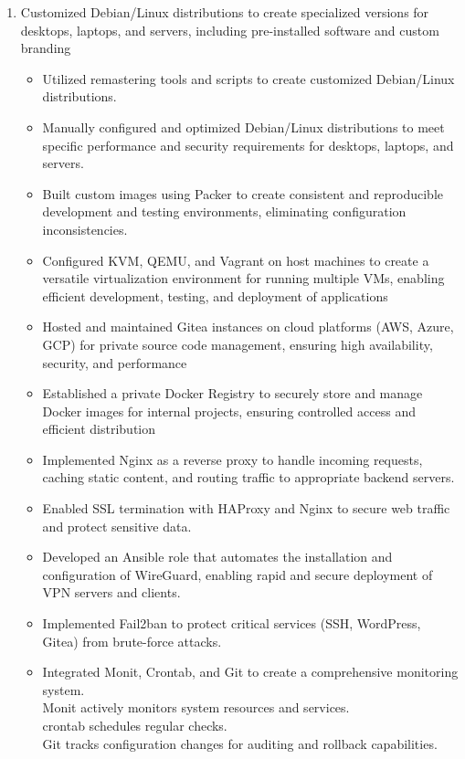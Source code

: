 \documentclass{article}
\begin{document}
\begin{enumerate}
    \item Customized Debian/Linux distributions to create specialized versions for desktops, laptops, and servers, including pre-installed software  and custom branding
   \begin{itemize}
    \item Utilized remastering tools and scripts to create customized Debian/Linux distributions.
    \item Manually configured and optimized Debian/Linux distributions to meet specific performance and security requirements for desktops, laptops, and servers.
    \item Built custom images using Packer to create consistent and reproducible development and testing environments, eliminating configuration inconsistencies.
    \item Configured KVM, QEMU, and Vagrant on host machines to create a versatile virtualization environment for running multiple VMs, enabling efficient development, testing, and deployment of applications
    \item Hosted and maintained Gitea instances on cloud platforms (AWS, Azure, GCP) for private source code management, ensuring high availability, security, and performance
    \item Established a private Docker Registry to securely store and manage Docker images for internal projects, ensuring controlled access and efficient distribution
    \item Implemented Nginx as a reverse proxy to handle incoming requests, caching static content, and routing traffic to appropriate backend servers.
    \item Enabled SSL termination with HAProxy and Nginx to secure web traffic and protect sensitive data.
    \item Developed an Ansible role that automates the installation and configuration of WireGuard, enabling rapid and secure deployment of VPN servers and clients.
    \item Implemented Fail2ban to protect critical services (SSH, WordPress, Gitea) from brute-force attacks.
    \item Integrated Monit, Crontab, and Git to create a comprehensive monitoring system.\\
     Monit actively monitors system resources and services.\\
     crontab schedules regular checks.  \\
     Git tracks configuration changes for auditing and rollback capabilities.

\end{itemize}
\end{enumerate}
\end{document}
